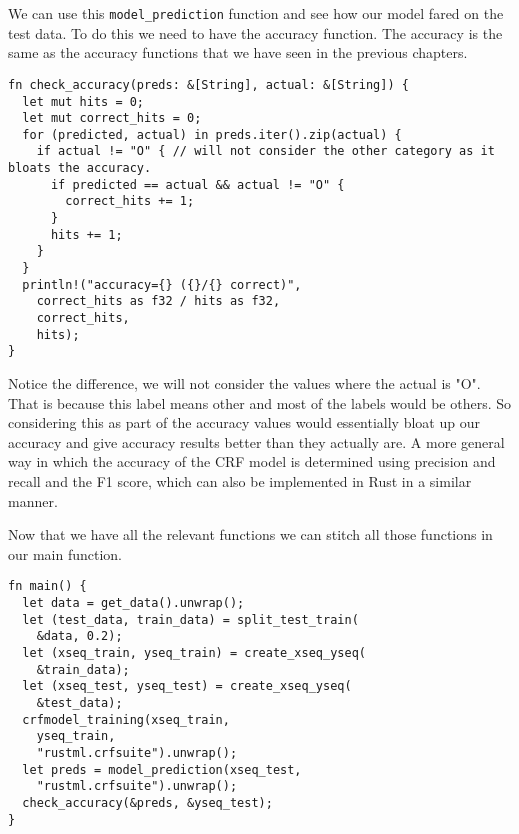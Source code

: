 \documentclass{book}
\begin{document}
We can use this \lstinline{model_prediction} function and see how our model fared on the test data. To do this we need to have the accuracy function. The accuracy is the same as the accuracy functions that we have seen in the previous chapters.

\begin{lstlisting}[caption={chapter5\\/crfsuite\\-model\\/src\\/main\\.rs}, basicstyle=\small]
fn check_accuracy(preds: &[String], actual: &[String]) {
  let mut hits = 0;
  let mut correct_hits = 0;
  for (predicted, actual) in preds.iter().zip(actual) {
    if actual != "O" { // will not consider the other category as it bloats the accuracy.
      if predicted == actual && actual != "O" {
        correct_hits += 1;
      }
      hits += 1;
    }
  }
  println!("accuracy={} ({}/{} correct)",
    correct_hits as f32 / hits as f32,
    correct_hits,
    hits);
}
\end{lstlisting}

Notice the difference, we will not consider the values where the actual is "O". That is because this label means other and most of the labels would be others. So considering this as part of the accuracy values would essentially bloat up our accuracy and give accuracy results better than they actually are. A more general way in which the accuracy of the CRF model is determined using precision and recall and the F1 score, which can also be implemented in Rust in a similar manner.

Now that we have all the relevant functions we can stitch all those functions in our main function.

\begin{lstlisting}[caption={chapter5\\/crfsuite\\-model\\/src\\/main\\.rs}, basicstyle=\small]
fn main() {
  let data = get_data().unwrap();
  let (test_data, train_data) = split_test_train(
  	&data, 0.2);
  let (xseq_train, yseq_train) = create_xseq_yseq(
  	&train_data);
  let (xseq_test, yseq_test) = create_xseq_yseq(
  	&test_data);
  crfmodel_training(xseq_train,
  	yseq_train,
	"rustml.crfsuite").unwrap();
  let preds = model_prediction(xseq_test,
  	"rustml.crfsuite").unwrap();
  check_accuracy(&preds, &yseq_test);
}
\end{lstlisting}
\end{document}
